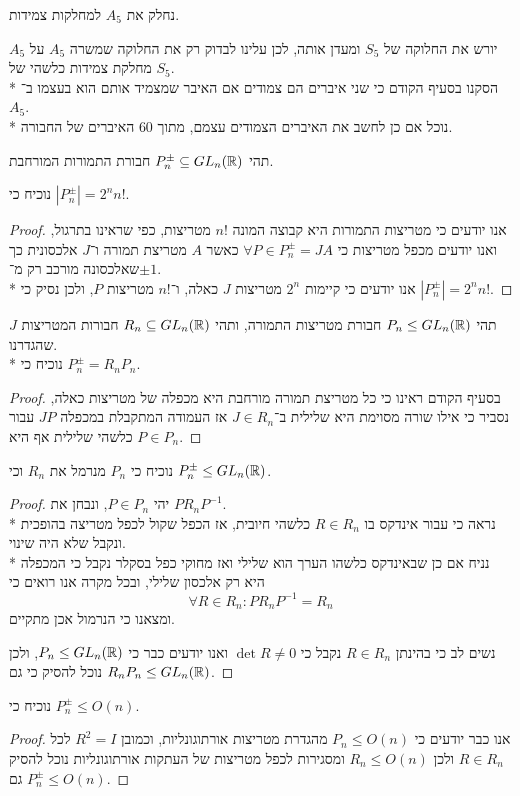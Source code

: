 \Subquestion{}
נחלק את $A_5$ למחלקות צמידות.

$A_5$ יורש את החלוקה של $S_5$ ומעדן אותה, לכן עלינו לבדוק רק את החלוקה שמשרה $A_5$ על מחלקת צמידות כלשהי של $S_5$. \\*
הסקנו בסעיף הקודם כי שני איברים הם צמודים אם האיבר שמצמיד אותם הוא בעצמו ב־$A_5$. \\*
נוכל אם כן לחשב את האיברים הצמודים עצמם, מתוך 60 האיברים של החבורה.

\Question{}
תהי $P_n^\pm \subseteq GL_n(\mathbb{R})$ חבורת התמורות המורחבת.

\Subquestion{}
נוכיח כי $|P_n^\pm| = 2^n n! $.
\begin{proof}
	אנו יודעים כי מטריצות התמורות היא קבוצה המונה $n! $ מטריצות, כפי שראינו בתרגול, ואנו יודעים מכפל מטריצות כי $\forall P \in P_n^\pm = J A$ כאשר $A$ מטריצת תמורה ו־$J$ אלכסונית כך שאלכסונה מורכב רק מ־$\pm1$. \\*
	אנו יודעים כי קיימות $2^n$ מטריצות $J$ כאלה, ו־$n! $ מטריצות $P$, ולכן נסיק כי $|P_n^\pm| = 2^n n! $.
\end{proof}

\Subquestion{}
תהי $P_n \le GL_n(\mathbb{R})$ חבורת מטריצות התמורה, ותהי $R_n \subseteq GL_n(\mathbb{R})$ חבורות המטריצות $J$ שהגדרנו. \\*
נוכיח כי $P_n^\pm = R_n P_n$.
\begin{proof}
	בסעיף הקודם ראינו כי כל מטריצת תמורה מורחבת היא מכפלה של מטריצות כאלה, נסביר כי אילו שורה מסוימת היא שלילית ב־$J \in R_n$ אז העמודה המתקבלת במכפלה $J P$ עבור $P \in P_n$ כלשהי שלילית אף היא.
\end{proof}

\Subquestion{}
נוכיח כי $P_n$ מנרמל את $R_n$ וכי $P_n^\pm \le GL_n(\mathbb{R})$.
\begin{proof}
	יהי $P \in P_n$, ונבחן את $P R_n P^{-1}$. \\*
	נראה כי עבור אינדקס בו $R \in R_n$ כלשהי חיובית, אז הכפל שקול לכפל מטריצה בהופכית ונקבל שלא היה שינוי. \\*
	נניח אם כן שבאינדקס כלשהו הערך הוא שלילי ואז מחוקי כפל בסקלר נקבל כי המכפלה היא רק אלכסון שלילי, ובכל מקרה אנו רואים כי
	\[
		\forall R \in R_n : P R_n P^{-1} = R_n
	\]
	ומצאנו כי הנרמול אכן מתקיים.

	נשים לב כי בהינתן $R \in R_n$ נקבל כי $\det R \ne 0$ ואנו יודעים כבר כי $P_n \le GL_n(\mathbb{R})$, ולכן נוכל להסיק כי גם $R_n P_n \le GL_n(\mathbb{R})$.
\end{proof}

\Subquestion{}
נוכיח כי $P_n^\pm \le O(n)$.
\begin{proof}
	אנו כבר יודעים כי $P_n \le O(n)$ מהגדרת מטריצות אורתוגונליות, וכמובן $R^2 = I$ לכל $R \in R_n$ ולכן $R_n \le O(n)$ ומסגירות לכפל מטריצות של העתקות אורתוגונליות נוכל להסיק גם $P_n^\pm \le O(n)$.
\end{proof}

